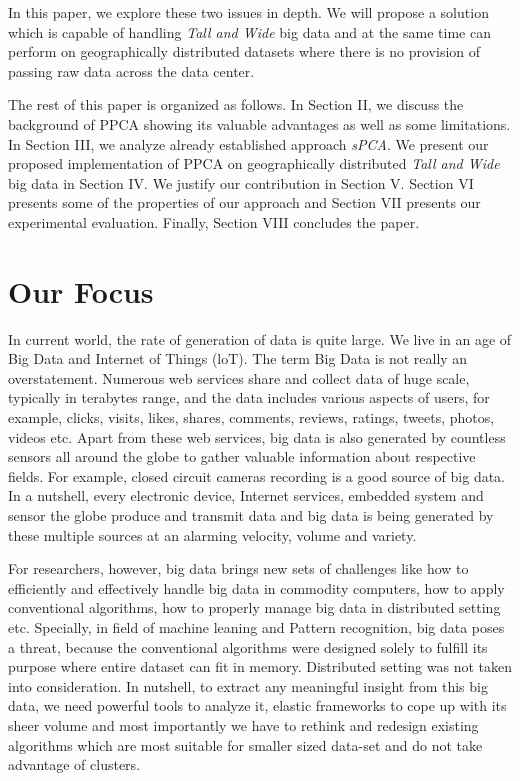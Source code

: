 \documentclass[10pt,conference,letterpaper]{IEEEtran}
\begin{document}
In this paper, we explore these two issues in depth. We will propose a solution which is capable of handling \textit{Tall and Wide} big data and at the same time can perform on geographically distributed datasets where there is no provision of passing raw data across the data center. 


The rest of this paper is organized as follows. In Section II, we discuss the background of PPCA showing its valuable advantages as well as some limitations. In Section III, we analyze already established approach \textit{sPCA}. We present our proposed implementation of PPCA on geographically distributed \textit{Tall and Wide} big data in Section IV. We justify our contribution in Section V. Section VI presents some of the properties of our approach and Section VII presents our experimental evaluation. Finally, Section VIII concludes the paper.



\section{Our Focus}
In current world, the rate of generation of data is quite large. We live in an age of Big Data and Internet of Things (loT). The term Big Data is not really an overstatement. Numerous web services share and collect data of huge scale, typically in terabytes range, and the data includes various aspects of users, for example, clicks, visits, likes, shares, comments, reviews, ratings, tweets, photos, videos etc. Apart from these web services, big data is also generated by countless sensors all around the globe to gather valuable information about respective fields. For example, closed circuit cameras recording is a good source of big data. In a nutshell, every electronic device, Internet services, embedded system and sensor the globe produce and transmit data and big data is being generated by these multiple sources at an alarming velocity, volume and variety.

For researchers, however, big data brings new sets of challenges like how to efficiently and
effectively handle big data in commodity computers, how to apply conventional algorithms, how
to properly manage big data in distributed setting etc. Specially, in field of machine leaning and
Pattern recognition, big data poses a threat, because the conventional algorithms were designed
solely to fulfill its purpose where entire dataset can fit in memory. Distributed setting was not
taken into consideration. In nutshell, to extract any meaningful insight from this big data, we
need powerful tools to analyze it, elastic frameworks to cope up with its sheer volume and most
importantly we have to rethink and redesign existing algorithms which are most suitable for
smaller sized data-set and do not take advantage of clusters.
\end{document}
